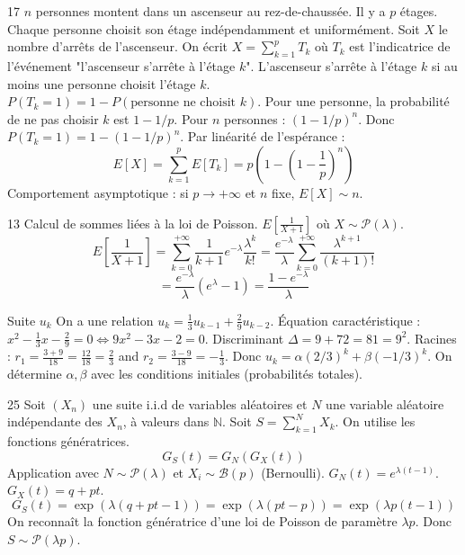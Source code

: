 \begin{correction}{17}
$n$ personnes montent dans un ascenseur au rez-de-chaussée. Il y a $p$ étages.
Chaque personne choisit son étage indépendamment et uniformément.
Soit $X$ le nombre d'arrêts de l'ascenseur.
On écrit $X = \sum_{k=1}^p T_k$ où $T_k$ est l'indicatrice de l'événement "l'ascenseur s'arrête à l'étage $k$".
L'ascenseur s'arrête à l'étage $k$ si au moins une personne choisit l'étage $k$.
$P(T_k = 1) = 1 - P(\text{personne ne choisit } k)$.
Pour une personne, la probabilité de ne pas choisir $k$ est $1 - 1/p$.
Pour $n$ personnes : $(1 - 1/p)^n$.
Donc $P(T_k = 1) = 1 - (1 - 1/p)^n$.
Par linéarité de l'espérance :
$$ E[X] = \sum_{k=1}^p E[T_k] = p \left( 1 - \left(1 - \frac{1}{p}\right)^n \right) $$
Comportement asymptotique : si $p \to + \infty$ et $n$ fixe, $E[X] \sim n$.
\end{correction}

\begin{correction}{13}
Calcul de sommes liées à la loi de Poisson.
$E[\frac{1}{X+1}]$ où $X \sim \mathcal{P}(\lambda)$.
$$ E\left[\frac{1}{X+1}\right] = \sum_{k=0}^{+ \infty} \frac{1}{k+1} e^{-\lambda} \frac{\lambda^k}{k!} = \frac{e^{-\lambda}}{\lambda} \sum_{k=0}^{+ \infty} \frac{\lambda^{k+1}}{(k+1)!} $$
$$ = \frac{e^{-\lambda}}{\lambda} (e^\lambda - 1) = \frac{1 - e^{-\lambda}}{\lambda} $$
\end{correction}

\begin{correction}{Suite $u_k$}
On a une relation $u_k = \frac{1}{3} u_{k-1} + \frac{2}{9} u_{k-2}$.
Équation caractéristique : $x^2 - \frac{1}{3}x - \frac{2}{9} = 0 \iff 9x^2 - 3x - 2 = 0$.
Discriminant $\Delta = 9 + 72 = 81 = 9^2$.
Racines : $r_1 = \frac{3+9}{18} = \frac{12}{18} = \frac{2}{3}$ and $r_2 = \frac{3-9}{18} = -\frac{1}{3}$.
Donc $u_k = \alpha (2/3)^k + \beta (-1/3)^k$.
On détermine $\alpha, \beta$ avec les conditions initiales (probabilités totales).
\end{correction}

\begin{correction}{25}
Soit $(X_n)$ une suite i.i.d de variables aléatoires et $N$ une variable aléatoire indépendante des $X_n$, à valeurs dans $\mathbb{N}$.
Soit $S = \sum_{k=1}^N X_k$.
On utilise les fonctions génératrices.
$$ G_S(t) = G_N(G_X(t)) $$
Application avec $N \sim \mathcal{P}(\lambda)$ et $X_i \sim \mathcal{B}(p)$ (Bernoulli).
$G_N(t) = e^{\lambda(t-1)}$. $G_X(t) = q + pt$.
$$ G_S(t) = \exp(\lambda(q+pt-1)) = \exp(\lambda(pt - p)) = \exp(\lambda p (t-1)) $$
On reconnaît la fonction génératrice d'une loi de Poisson de paramètre $\lambda p$.
Donc $S \sim \mathcal{P}(\lambda p)$.
\end{correction}

